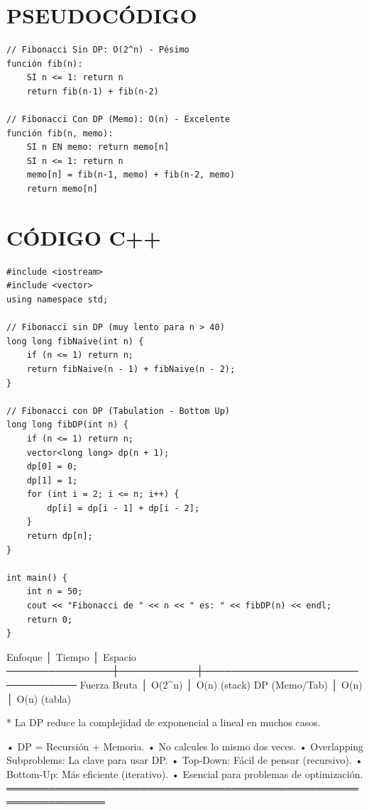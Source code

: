 \section*{PSEUDOCÓDIGO}
\hrulefill
\begin{verbatim}
// Fibonacci Sin DP: O(2^n) - Pésimo
función fib(n):
    SI n <= 1: return n
    return fib(n-1) + fib(n-2)

// Fibonacci Con DP (Memo): O(n) - Excelente
función fib(n, memo):
    SI n EN memo: return memo[n]
    SI n <= 1: return n
    memo[n] = fib(n-1, memo) + fib(n-2, memo)
    return memo[n]
\end{verbatim}
\section*{CÓDIGO C++}
\hrulefill
\begin{lstlisting}
#include <iostream>
#include <vector>
using namespace std;

// Fibonacci sin DP (muy lento para n > 40)
long long fibNaive(int n) {
    if (n <= 1) return n;
    return fibNaive(n - 1) + fibNaive(n - 2);
}

// Fibonacci con DP (Tabulation - Bottom Up)
long long fibDP(int n) {
    if (n <= 1) return n;
    vector<long long> dp(n + 1);
    dp[0] = 0;
    dp[1] = 1;
    for (int i = 2; i <= n; i++) {
        dp[i] = dp[i - 1] + dp[i - 2];
    }
    return dp[n];
}

int main() {
    int n = 50;
    cout << "Fibonacci de " << n << " es: " << fibDP(n) << endl;
    return 0;
}
\end{lstlisting}
\begin{dsacomplejidad}
Enfoque        │ Tiempo    │ Espacio
  ───────────────┼───────────┼────────────────────────────────
  Fuerza Bruta   │ O(2\textasciicircum{}n)    │ O(n) (stack)
  DP (Memo/Tab)  │ O(n)      │ O(n) (tabla)

* La DP reduce la complejidad de exponencial a lineal en muchos casos.
\end{dsacomplejidad}
\begin{dsaentrevistas}

\end{dsaentrevistas}
\begin{dsaresumen}
• DP = Recursión + Memoria.
• No calcules lo mismo dos veces.
• Overlapping Subproblems: La clave para usar DP.
• Top-Down: Fácil de pensar (recursivo).
• Bottom-Up: Más eficiente (iterativo).
• Esencial para problemas de optimización.
════════════════════════════════════════════════════════════════
\end{dsaresumen}


